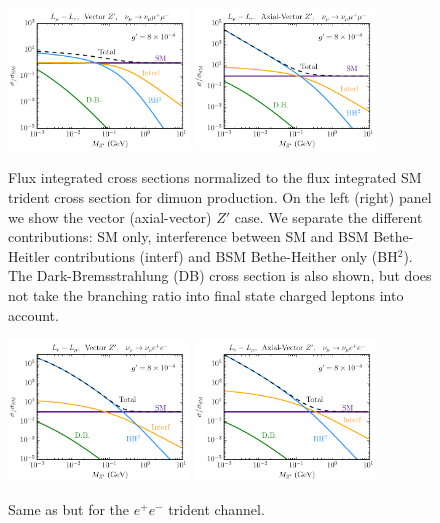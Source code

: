 %
\begin{figure}[t]
%
\includegraphics[width=0.43\textwidth]{SMvsBSMmass_xsec_mmmm_vec.pdf}
\includegraphics[width=0.43\textwidth]{SMvsBSMmass_xsec_mmmm_ax.pdf}
\caption{\label{fig:xsecs_mmmm} Flux integrated cross sections normalized to the flux integrated SM trident cross section for dimuon production. On the left (right) panel we show the vector (axial-vector) $Z'$ 
case. We separate the different contributions:
 SM only, interference between SM and BSM Bethe-Heitler contributions (interf) and BSM Bethe-Heither only (BH$^2$). The Dark-Bremsstrahlung (DB) cross section is also shown, but does not take the branching ratio into final state charged leptons into account.}
%
\end{figure}
%
\begin{figure}[t]
%
\includegraphics[width=0.43\textwidth]{SMvsBSMmass_xsec_mmee_vec.pdf}
\includegraphics[width=0.43\textwidth]{SMvsBSMmass_xsec_mmee_ax.pdf}
%
\caption{\label{fig:xsecs_mmee} Same as  but for the $e^+e^-$ trident channel.}
%
\end{figure}

